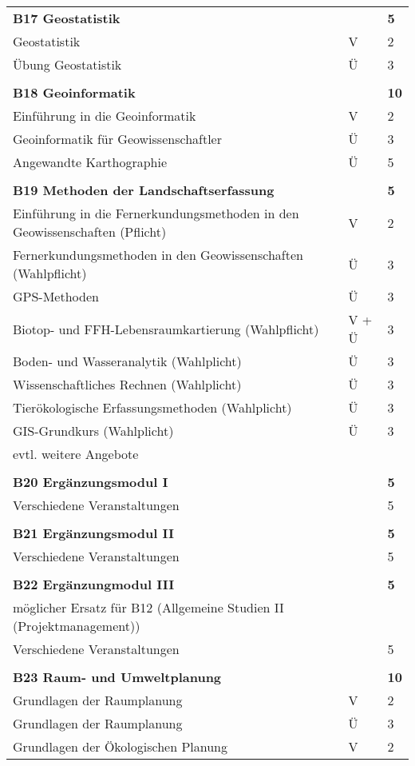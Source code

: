 \begin{longtable}{p{} p{} p{}}
\textbf{B17 Geostatistik} && \textbf{5}\\
Geostatistik & V & 2\\
Übung Geostatistik & Ü & 3\\
&&\\
\textbf{B18 Geoinformatik} && \textbf{10}\\
Einführung in die Geoinformatik & V & 2\\
Geoinformatik für Geowissenschaftler & Ü & 3\\
Angewandte Karthographie & Ü & 5\\
&&\\
\textbf{B19 Methoden der Landschaftserfassung}&&\textbf{5}\\
Einführung in die Fernerkundungsmethoden in den Geowissenschaften (Pflicht) & V & 2\\
Fernerkundungsmethoden in den Geowissenschaften (Wahlpflicht) & Ü & 3\\
GPS-Methoden & Ü & 3\\
Biotop- und FFH-Lebensraumkartierung (Wahlpflicht) & V + Ü & 3\\
Boden- und Wasseranalytik (Wahlplicht) & Ü & 3\\
Wissenschaftliches Rechnen (Wahlplicht) & Ü & 3\\
Tierökologische Erfassungsmethoden (Wahlplicht) & Ü & 3\\
GIS-Grundkurs (Wahlplicht)  & Ü & 3\\
evtl. weitere Angebote\\
&&\\
\textbf{B20 Ergänzungsmodul I} && \textbf{5}\\
Verschiedene Veranstaltungen & & 5\\
&&\\
\textbf{B21 Ergänzungsmodul II} && \textbf{5}\\
Verschiedene Veranstaltungen & & 5\\
&&\\
\textbf{B22 Ergänzungmodul III} && \textbf{5}\\
möglicher Ersatz für B12 (Allgemeine Studien II (Projektmanagement))\\
Verschiedene Veranstaltungen & & 5\\
&&\\
\textbf{B23 Raum- und Umweltplanung}&&\textbf{10}\\
Grundlagen der Raumplanung & V & 2\\
Grundlagen der Raumplanung & Ü & 3\\
Grundlagen der Ökologischen Planung & V & 2\\

\end{longtable}
